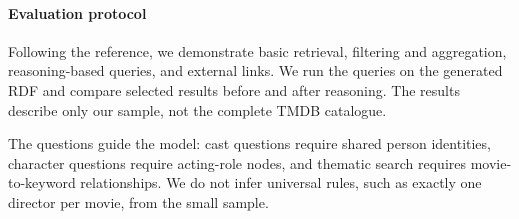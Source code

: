 \paragraph{Evaluation protocol}
Following the reference, we demonstrate basic retrieval, filtering and aggregation, reasoning-based queries, and external links. We run the queries on the generated RDF and compare selected results before and after reasoning. The results describe only our sample, not the complete TMDB catalogue.

The questions guide the model: cast questions require shared person identities,
character questions require acting-role nodes, and thematic search requires
movie-to-keyword relationships. We do not infer universal rules, such as exactly
one director per movie, from the small sample.
